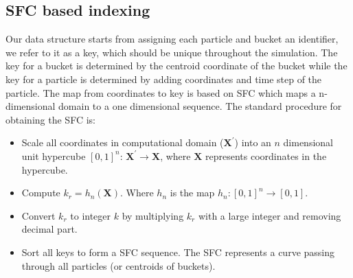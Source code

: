 \documentclass[procedia]{easychair}
\begin{document}
\subsection{SFC based indexing}
Our data structure starts from assigning each particle and bucket an identifier, we refer to it as a key, which should be unique throughout the simulation. The key for a bucket is determined by the centroid coordinate of the bucket while the key for a particle is determined by adding coordinates and time step of the particle. The map from coordinates to key is based on SFC \cite{sagan2012space} which maps a n-dimensional domain to a one dimensional sequence. The standard procedure for obtaining the SFC is: 
\begin{itemize}
\item Scale all coordinates in computational domain ($\textbf{X}^\prime$) into an $n$ dimensional unit hypercube $[0,1]^n $: $\textbf{X}^\prime \rightarrow \textbf{X}$, where $\textbf{X}$ represents coordinates in the hypercube.
\item Compute $k_r = h_n(\textbf{X})$. Where $h_n$ is the map $h_n: [0,1]^n \rightarrow [0,1]$. 
\item Convert $k_r$ to integer $k$ by multiplying $k_r$ with a large integer and removing decimal part.
\item Sort all keys to form a SFC sequence. The SFC represents a curve passing through all particles (or centroids of buckets).
\end{itemize}
%
\end{document}
